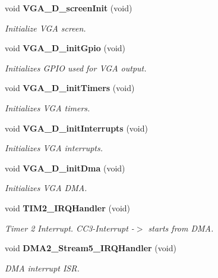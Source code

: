\begin{DoxyCompactItemize}
\item 
void {\bf V\+G\+A\+\_\+\+D\+\_\+screen\+Init} (void)\label{vga__screen_8h_a54818b513bc50721e3414724e81d63dc}

\begin{DoxyCompactList}\small\item\em Initialize V\+GA screen. \end{DoxyCompactList}\item 
void {\bf V\+G\+A\+\_\+\+D\+\_\+init\+Gpio} (void)\label{vga__screen_8h_ab19664a6f56c7b194d96c9efbe9fdb0d}

\begin{DoxyCompactList}\small\item\em Initializes G\+P\+IO used for V\+GA output. \end{DoxyCompactList}\item 
void {\bf V\+G\+A\+\_\+\+D\+\_\+init\+Timers} (void)\label{vga__screen_8h_a7f81e81736a511dc5962d38b6932f172}

\begin{DoxyCompactList}\small\item\em Initializes V\+GA timers. \end{DoxyCompactList}\item 
void {\bf V\+G\+A\+\_\+\+D\+\_\+init\+Interrupts} (void)\label{vga__screen_8h_ae0c623841b4a18c412d175c13941c090}

\begin{DoxyCompactList}\small\item\em Initializes V\+GA interrupts. \end{DoxyCompactList}\item 
void {\bf V\+G\+A\+\_\+\+D\+\_\+init\+Dma} (void)\label{vga__screen_8h_a759d1d311be7995699a6550ee2329d15}

\begin{DoxyCompactList}\small\item\em Initializes V\+GA D\+MA. \end{DoxyCompactList}\item 
void {\bf T\+I\+M2\+\_\+\+I\+R\+Q\+Handler} (void)
\begin{DoxyCompactList}\small\item\em Timer 2 Interrupt. C\+C3-\/\+Interrupt -\/$>$ starts from D\+MA. \end{DoxyCompactList}\item 
void {\bf D\+M\+A2\+\_\+\+Stream5\+\_\+\+I\+R\+Q\+Handler} (void)
\begin{DoxyCompactList}\small\item\em D\+MA interrupt I\+SR. \end{DoxyCompactList}\end{DoxyCompactItemize}
